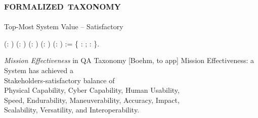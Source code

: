 \documentclass[xcolor=x11names,compress]{beamer}
\renewcommand{\(}{\begin{columns}}
\renewcommand{\)}{\end{columns}}
\newcommand{\<}[1]{\begin{column}{#1}}
\renewcommand{\>}{\end{column}}
\begin{document}
\subsection{\scshape formalized taxonomy}
\begin{frame}{Top-Most System Value -- \small{Satisfactory}}
\small{
\begin{coqdoccode}
\coqdocemptyline
\coqdocnoindent
{}  (: ) (: ) (: ) \coqdoceol
\coqdocindent{8.70em}
(: ) (: ) := \{\coqdoceol
\coqdocindent{2.00em}
:       ;\coqdoceol
\coqdocindent{2.00em}
:      \coqdoceol
\coqdocnoindent
\}.\coqdoceol
\end{coqdoccode}
}
\end{frame}



\begin{frame}{{\em Mission Effectiveness} in QA Taxonomy [Boehm, to app]}
Mission Effectiveness: a System has achieved a\\
\coqdocindent{1.50em} Stakeholders-satisfactory balance of\\
\coqdocindent{2.50em} Physical Capability, Cyber Capability, Human Usability, \\
\coqdocindent{2.50em} Speed, Endurability, Maneuverability, Accuracy, Impact, \\
\coqdocindent{2.50em} Scalability, Versatility, and Interoperability.
\end{frame}

\end{document}
